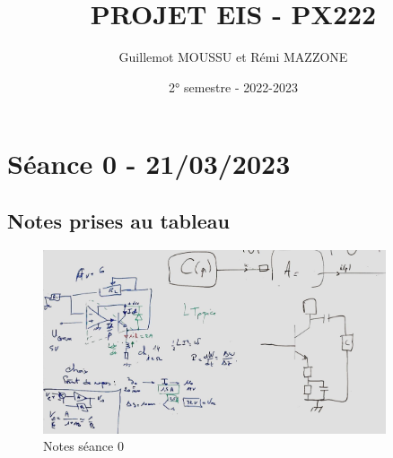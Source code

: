 \documentclass[11pt,a4paper]{article}
\title{PROJET EIS - PX222}
\author{Guillemot MOUSSU et Rémi MAZZONE}
\date{2° semestre - 2022-2023}
\begin{document}
\maketitle
\tableofcontents
\listoffigures
\pagebreak

\section{Séance 0 - 21/03/2023}
\subsection{Notes prises au tableau}
\begin{figure} [H]
\begin{center}
\includegraphics[width=0.9\textwidth]{Schémas/Notes tableau séance 0.png} 
\end{center}
\caption{Notes séance 0}
\end{figure}
\end{document}
